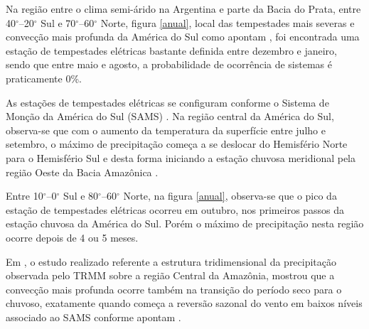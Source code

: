  

Na região entre o clima semi-árido na Argentina e parte da Bacia do Prata, entre 40$^{\circ}$--20$^{\circ}$ Sul e 70$^{\circ}$--60$^{\circ}$ Norte, figura \ref{anual}, local das tempestades mais severas e convecção mais profunda da América do Sul como apontam , foi encontrada uma estação de tempestades elétricas bastante definida entre dezembro e janeiro, sendo que entre maio e agosto, a probabilidade de ocorrência de sistemas é praticamente 0\%.%

As estações de tempestades elétricas se configuram conforme o Sistema de Monção da América do Sul (SAMS)   . Na região central da América do Sul, observa-se que com o aumento da temperatura da superfície entre julho e setembro, o máximo de precipitação começa a se deslocar do Hemisfério Norte para o Hemisfério Sul e desta forma iniciando a estação chuvosa meridional pela região Oeste da Bacia Amazônica \cite{Zhou1998,grimm2003nino,reboita2010regimes,Marengo2012}.

Entre 10$^{\circ}$--0$^{\circ}$ Sul e 80$^{\circ}$--60$^{\circ}$ Norte,  na figura \ref{anual}, observa-se que o pico da estação de tempestades elétricas ocorreu em outubro, nos primeiros passos da estação chuvosa da América do Sul. Porém o máximo de precipitação nesta região ocorre depois de 4 ou 5 meses. 

Em , o estudo realizado referente a estrutura tridimensional da precipitação observada pelo TRMM sobre a região Central da Amazônia, mostrou que a convecção mais profunda ocorre também na transição do período seco para o chuvoso, exatamente quando começa a reversão sazonal do vento em baixos níveis associado ao SAMS conforme apontam .

